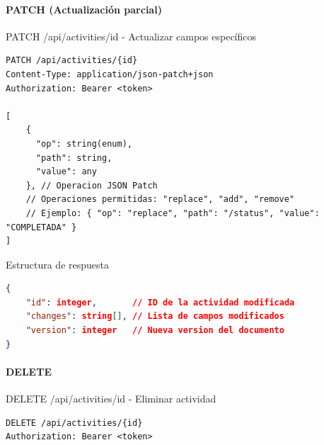 \documentclass[11pt,a4paper]{article}
\begin{document}
\paragraph{PATCH (Actualización parcial)}
\begin{center}
	\begin{minipage}{\textwidth}
		\begin{codebox}{PATCH /api/activities/{id} - Actualizar campos específicos}
			\begin{lstlisting}[language=HTTP]
PATCH /api/activities/{id}
Content-Type: application/json-patch+json
Authorization: Bearer <token>

[
    { 
      "op": string(enum), 
      "path": string, 
      "value": any 
    }, // Operacion JSON Patch
    // Operaciones permitidas: "replace", "add", "remove"
    // Ejemplo: { "op": "replace", "path": "/status", "value": "COMPLETADA" }
]
\end{lstlisting}
		\end{codebox}
	\end{minipage}
\end{center}

\begin{center}
	\begin{minipage}{\textwidth}
		\begin{codebox}{Estructura de respuesta}
			\begin{lstlisting}[language=json]
{
    "id": integer,       // ID de la actividad modificada
    "changes": string[], // Lista de campos modificados
    "version": integer   // Nueva version del documento
}
\end{lstlisting}
		\end{codebox}
	\end{minipage}
\end{center}

\paragraph{DELETE}
\begin{center}
	\begin{minipage}{\textwidth}
		\begin{codebox}{DELETE /api/activities/{id} - Eliminar actividad}
			\begin{lstlisting}[language=HTTP]
DELETE /api/activities/{id}
Authorization: Bearer <token>
\end{lstlisting}
		\end{codebox}
	\end{minipage}
\end{center}
\end{document}
